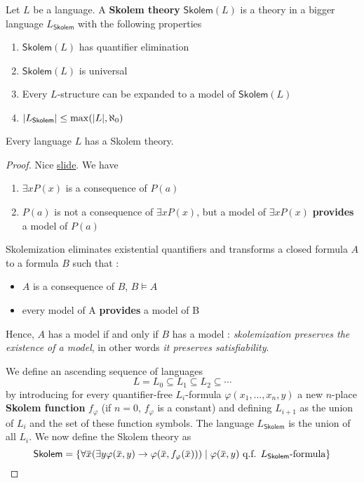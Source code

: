 \documentclass[11pt]{article}
\def \Skolem {\textsf{Skolem}}
\begin{document}
\begin{definition}[]
Let \(L\) be a language. A \textbf{Skolem theory} \(\Skolem(L)\) is a theory in a bigger
language \(L_{\Skolem}\) with the following properties
\begin{enumerate}
\item \(\Skolem(L)\) has quantifier elimination
\item \(\Skolem(L)\) is universal
\item Every \(L\)-structure can be expanded to a model of \(\Skolem(L)\)
\item \(\abs{L_{\Skolem}}\le\max(\abs{L},\aleph_0)\)
\end{enumerate}
\end{definition}

\begin{theorem}[]
Every language \(L\) has a Skolem theory.
\end{theorem}

\begin{proof}
Nice \href{http://www-verimag.imag.fr/\~monin/EnseignementPublic/Misc/L2/INF242/Slides/cours09skolem\_En.pdf}{slide}. We have
\begin{enumerate}
\item \(\exists xP(x)\) is a consequence of \(P(a)\)
\item \(P(a)\) is not a consequence of \(\exists xP(x)\), but a model of \(\exists xP(x)\) \textbf{provides} a model
of \(P(a)\)
\end{enumerate}


Skolemization eliminates existential quantifiers and transforms a closed formula \(A\) to a formula \(B\) such that :
\begin{itemize}
\item \(A\) is a consequence of \(B\), \(B\vDash A\)
\item every model of A \textbf{provides} a model of B
\end{itemize}


Hence, \(A\) has a model if and only if \(B\) has a model : \emph{skolemization preserves the
existence of a model}, in other words \emph{it preserves satisfiability}.


We define an ascending sequence of languages
\begin{equation*}
L=L_0\subseteq L_1\subseteq L_2\subseteq\cdots
\end{equation*}
by introducing for every quantifier-free \(L_i\)-formula \(\varphi(x_1,\dots,x_n,y)\) a new \(n\)-place
\textbf{Skolem function}  \(f_\varphi\) (if \(n=0\), \(f_\varphi\) is a constant) and defining \(L_{i+1}\) as the
union of \(L_i\) and the set of these function symbols. The language \(L_{\Skolem}\) is the union
of all \(L_i\). We now define the Skolem theory as
\begin{equation*}
\Skolem=\{\forall\barx(\exists y\varphi(\barx,y)\to\varphi(\barx,f_\varphi(\barx)))\mid\varphi(\barx,y)\text{ q.f. $L_{\Skolem}$-formula}\}
\end{equation*}
\end{proof}
\end{document}
